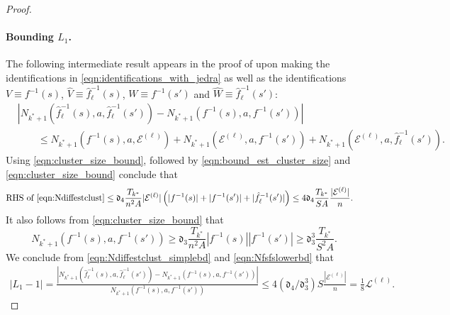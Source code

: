 \documentclass[11pt]{article}
\newcommand{\mf}[1]{\mathfrak{#1}}
\newcommand{\mcE}{\mathcal{E}}
\newcommand{\mcL}{\mathcal{L}}
\newcommand{\lb}{\left(}
\newcommand{\rb}{\right)}
\theoremstyle{definition}
\theoremstyle{definition}
\begin{document}
\begin{proof}
	\paragraph{Bounding $L_1$.}

	The following intermediate result appears in the proof of \cite[Lemma 25]{Jedra:2022} upon making the identifications in \eqref{eqn:identifications_with_jedra} as well as the identifications $V\equiv f^{-1}(s)$, $\hat{V}\equiv \hat{f}_{\ell}^{-1}(s)$, $W\equiv f^{-1}(s')$ and $\hat{W}\equiv \hat{f}_{\ell}^{-1}(s')$:
	\begin{equation}
		\label{eqn:Ndiffestclust}
		\begin{split}
			 &
			\left|N_{k^*+1}(\hat{f}_{\ell}^{-1}(s),a,\hat{f}_{\ell}^{-1}(s'))-N_{k^*+1}(f^{-1}(s),a,f^{-1}(s'))\right| \\
			 &
			\qquad\leq N_{k^*+1}(f^{-1}(s),a,\mcE^{(\ell)})+N_{k^*+1}(\mcE^{(\ell)},a,f^{-1}(s'))+N_{k^*+1}(\mcE^{(\ell)},a,\hat{f}_{\ell}^{-1}(s')).
		\end{split}
	\end{equation}
	Using \eqref{eqn:cluster_size_bound}, followed by \eqref{eqn:bound_est_cluster_size} and \eqref{eqn:cluster_size_bound} conclude that
	\begin{equation}
		\label{eqn:Ndiffestclust_simplebd}
		\begin{split}
			\textnormal{RHS of }\eqref{eqn:Ndiffestclust}
			 &
			\leq
			\mf{d}_4\frac{T_{k^*}}{n^2A}|\mcE^{(\ell)}|
			\lb |f^{-1}(s)|+|f^{-1}(s')|+|\hat{f}^{-1}_{\ell}(s')| \rb
			\leq
			4\mf{d}_4\frac{T_{k^*}}{SA}\frac{|\mcE^{(\ell)}|}{n}.
		\end{split}
	\end{equation}
	It also follows from \eqref{eqn:cluster_size_bound} that
	\begin{equation}
		\label{eqn:Nfsfslowerbd}
		N_{k^*+1}(f^{-1}(s),a,f^{-1}(s'))
		\geq
		\mf{d}_3
		\frac{T_{k^*}}{n^2A}
		|f^{-1}(s)||f^{-1}(s')|
		\geq
		\mf{d}_3^3\frac{T_{k^*}}{S^2A}.
	\end{equation}
	We conclude from \eqref{eqn:Ndiffestclust_simplebd} and \eqref{eqn:Nfsfslowerbd} that
	\begin{equation}
		\begin{split}
			\left|L_1-1\right|
			=
			\frac{|N_{k^*+1}(\hat{f}_{\ell}^{-1}(s),a,\hat{f}_{\ell}^{-1}(s'))-N_{k^*+1}(f^{-1}(s),a,f^{-1}(s'))|}{N_{k^*+1}(f^{-1}(s),a,f^{-1}(s'))}
			\leq
			4(\mf{d}_4/\mf{d}_3^3) S\frac{|\mcE^{(\ell)}|}{n}
			=
			\frac{1}{8}
			\mcL^{(\ell)}
			.
		\end{split}
	\end{equation}

\end{proof}
\end{document}

